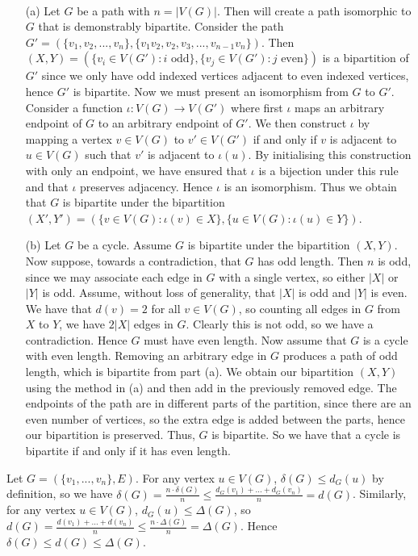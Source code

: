 \begin{ans} \
\begin{itemize}
	\item[(a)] Let $G$ be a path with $n = |V(G)|$. Then will create a path isomorphic to $G$ that is demonstrably bipartite. Consider the path $G' = (\{v_1,v_2,...,v_n\},\{v_1v_2,v_2,v_3,...,v_{n-1}v_n\})$. Then $(X,Y) = (\{v_i \in V(G'): \textrm{$i$ odd}\}, \{v_j \in V(G'): \textrm{$j$ even}\})$ is a bipartition of $G'$ since we only have odd indexed vertices adjacent to even indexed vertices, hence $G'$ is bipartite. Now we must present an isomorphism from $G$ to $G'$. Consider a function $\iota: V(G) \to V(G')$ where first $\iota$ maps an arbitrary endpoint of $G$ to an arbitrary endpoint of $G'$. We then construct $\iota$ by mapping a vertex $v \in V(G)$ to $v' \in V(G')$ if and only if $v$ is adjacent to $u \in V(G)$ such that $v'$ is adjacent to $\iota(u)$. By initialising this construction with only an endpoint, we have ensured that $\iota$ is a bijection under this rule and that $\iota$ preserves adjacency. Hence $\iota$ is an isomorphism. Thus we obtain that $G$ is bipartite under the bipartition $(X',Y') = (\{v \in V(G): \iota(v) \in X\},\{u \in V(G): \iota(u) \in Y\})$.
	\item[(b)] Let $G$ be a cycle. Assume $G$ is bipartite under the bipartition $(X,Y)$. Now suppose, towards a contradiction, that $G$ has odd length. Then $n$ is odd, since we may associate each edge in $G$ with a single vertex, so either $|X|$ or $|Y|$ is odd. Assume, without loss of generality, that $|X|$ is odd and $|Y|$ is even. We have that $d(v) = 2$ for all $v \in V(G)$, so counting all edges in $G$ from $X$ to $Y$, we have $2|X|$ edges in $G$. Clearly this is not odd, so we have a contradiction. Hence $G$ must have even length. Now assume that $G$ is a cycle with even length. Removing an arbitrary edge in $G$ produces a path of odd length, which is bipartite from part (a). We obtain our bipartition $(X,Y)$ using the method in (a) and then add in the previously removed edge. The endpoints of the path are in different parts of the partition, since there are an even number of vertices, so the extra edge is added between the parts, hence our bipartition is preserved. Thus, $G$ is bipartite. So we have that a cycle is bipartite if and only if it has even length.
\end{itemize}
\end{ans}

\begin{ans}
Let $G = (\{v_1,...,v_n\},E)$. For any vertex $u \in V(G)$, $\delta(G) \leq d_G(u)$ by definition, so we have $\delta(G) = \frac{n \cdot \delta(G)}{n} \leq \frac{d_G(v_1) + ... + d_G(v_n)}{n} = d(G)$. Similarly, for any vertex $u \in V(G)$, $d_G(u) \leq \Delta(G)$, so $d(G) = \frac{d(v_1) + ... + d(v_n)}{n} \leq \frac{n \cdot \Delta(G)}{n} = \Delta(G)$. Hence $\delta(G) \leq d(G) \leq \Delta(G)$.
\end{ans}

